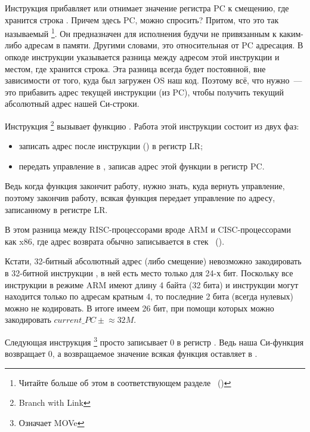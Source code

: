 \myindex{\PICcode}
Инструкция  прибавляет или отнимает значение регистра \ac{PC} к смещению, где хранится строка
.
Причем здесь \ac{PC}, можно спросить? Притом, что это так называемый \q{\PICcode}
\footnote{Читайте больше об этом в соответствующем разделе ~()}.
Он предназначен для исполнения будучи не привязанным к каким-либо адресам в памяти.
Другими словами, это относительная от \ac{PC} адресация.
В опкоде инструкции  указывается разница между адресом этой инструкции и местом, где хранится строка.
Эта разница всегда будет постоянной, вне зависимости от того, куда был загружен \ac{OS} наш код.
Поэтому всё, что нужно~--- это прибавить адрес текущей инструкции (из \ac{PC}), чтобы получить текущий абсолютный адрес нашей Си-строки.

Инструкция \footnote{Branch with Link} вызывает функцию \printf.
Работа этой инструкции состоит из двух фаз:

\begin{itemize}
\item записать адрес после инструкции  () в регистр \ac{LR};
\item передать управление в \printf, записав адрес этой функции в регистр \ac{PC}.
\end{itemize}

Ведь когда функция \printf закончит работу, нужно знать, куда вернуть управление, поэтому закончив работу, всякая функция передает управление по адресу, записанному в регистре \ac{LR}.

В этом разница между  \ac{RISC}-процессорами вроде ARM и \ac{CISC}-процессорами как x86,
где адрес возврата обычно записывается в стек ~().

Кстати, 32-битный абсолютный адрес (либо смещение) невозможно закодировать в 32-битной инструкции , в ней есть место только для 24-х бит.
Поскольку все инструкции в режиме ARM имеют длину 4 байта (32 бита) и инструкции могут находится только по адресам кратным 4, то последние 2 бита (всегда нулевых) можно не кодировать.
В итоге имеем 26 бит, при помощи которых можно закодировать $current\_PC \pm{} \approx{}32M$.

Следующая инструкция \footnote{Означает MOVe}
просто записывает 0 в регистр .
Ведь наша Си-функция возвращает 0, а возвращаемое значение всякая функция оставляет в .


